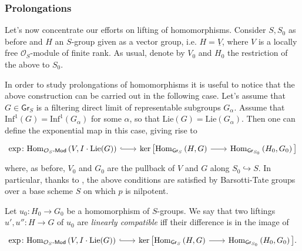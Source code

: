 \subsubsection{Prolongations}
Let's now concentrate our efforts on lifting of homomorphisms.
Consider $S, S_0$ as before and
$H$ an $S$-group given as a vector group,
i.e. $H = \underline{V}$, where $V$ is a locally free $\mathcal{O}_{ S }$-module
of finite rank.
As usual, denote by $V_0$ and $H_0$ the restriction of the above to $S_0$.


\begin{rem}
	In order to study prolongations of homomorphisms it is useful to notice that
	the above construction can be carried out in the following case.
	Let's assume that $G \in \mathsf{Gr}_S$ is a filtering direct limit of
	representable subgroups $G_\alpha$.
	Assume that $\mathrm{Inf}^1(G) = \mathrm{Inf}^1(G_\alpha)$ for some $\alpha$,
	so that $\mathrm{Lie}(G) = \mathrm{Lie}(G_\alpha)$.
	Then one can define the exponential map in this case, giving rise to
	\begin{equation*}
	\begin{tikzcd}[row sep = 0ex, column sep = 2.0em
		,/tikz/column 1/.append style={anchor=base east}
		,/tikz/column 2/.append style={anchor=base west}]
		\exp\colon
		\mathrm{Hom}_{ \mathcal{O}_{ S }\text{-}\mathsf{Mod} }
		\left( V, I \cdot \mathrm{Lie}(G) \right)
		\arrow[r, "", hookrightarrow] &
		\ker \big[ 
		\mathrm{Hom}_{ \mathsf{Gr}_S } 
		\left( H, G \right)
		\arrow[r, "", rightarrow] &
		\mathrm{Hom}_{ \mathsf{Gr}_{S_0} }
		\left( H_0, G_0 \right)
		\big]
	\end{tikzcd}
	\end{equation*} 
	where, as before, $V_0$ and $G_0$ are the pullback of $V$ and $G$ 
	along $S_0 \hookrightarrow S$.
	In particular, thanks to \cite[Chapter II, Corollary 3.3.16]{Messing},
	the above conditions are satisfied by Barsotti-Tate
	groups over a base scheme $S$ on which $p$ is nilpotent.
\end{rem}


\begin{defn}\label{defn:LinCompProlong}
	Let $u_0\colon H_0 \to G_0$ be a homomorphism of $S$-groups.
	We say that two liftings $u', u''\colon H \to G$ of $u_0$
	are {\em linearly compatible} iff their difference is in the image
	of 
	\begin{equation*}
	\begin{tikzcd}[row sep = 0ex, column sep = 2.0em
		,/tikz/column 1/.append style={anchor=base east}
		,/tikz/column 2/.append style={anchor=base west}]
		\exp\colon
		\mathrm{Hom}_{ \mathcal{O}_{ S }\text{-}\mathsf{Mod} }
		\left( V, I \cdot \mathrm{Lie}(G) \right)
		\arrow[r, "", hookrightarrow] &
		\ker \big[ 
		\mathrm{Hom}_{ \mathsf{Gr}_S } 
		\left( H, G \right)
		\arrow[r, "", rightarrow] &
		\mathrm{Hom}_{ \mathsf{Gr}_{S_0} }
		\left( H_0, G_0 \right)
		\big]
	.\end{tikzcd}
	\end{equation*} 
\end{defn}


